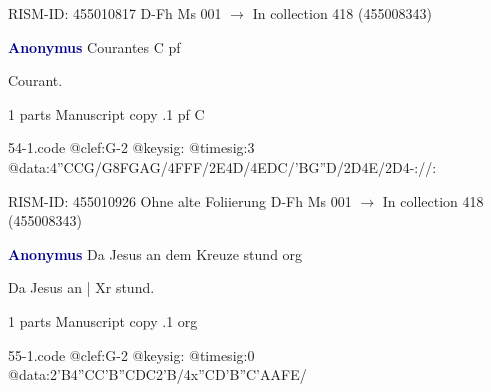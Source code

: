 \documentclass[twocolumn]{book}
\begin{document}
\newline RISM-ID: 455010817
\newline D-Fh  Ms 001
\newline $\rightarrow$ In collection 418 (455008343)

\newline \par \vspace{7pt} \textcolor{darkblue}{\textbf{Anonymus  }}
\newline Courantes  C  
\newline pf
\newline \begin{itshape}[f.58v, at left:] Courant.\end{itshape} 
\newline \textcolor{darkblue}{}  1 parts  
\newline Manuscript copy
.1  pf  C  
\begin{filecontents*}{54-1.code}
@clef:G-2
@keysig:
@timesig:3
@data:4''CCG/G{8FGAG}/4FFF/2E4D/4EDC/'BG''D/2D4E/2D4-://:
\end{filecontents*}
\newline
%

\newline RISM-ID: 455010926
\newline Ohne alte Foliierung
\newline D-Fh  Ms 001
\newline $\rightarrow$ In collection 418 (455008343)

\newline \par \vspace{7pt} \textcolor{darkblue}{\textbf{Anonymus  }}
\newline Da Jesus an dem Kreuze stund    
\newline org
\newline \begin{itshape}[f.31v, at left:] Da Jesus an | Xr stund.\end{itshape} 
\newline \textcolor{darkblue}{}  1 parts  
\newline Manuscript copy
.1  org  
\begin{filecontents*}{55-1.code}
@clef:G-2
@keysig:
@timesig:0
@data:2'B4''CC'B''CDC2'B/4x''CD'B''C'AAFE/
\end{filecontents*}
\newline
%
\end{document}
